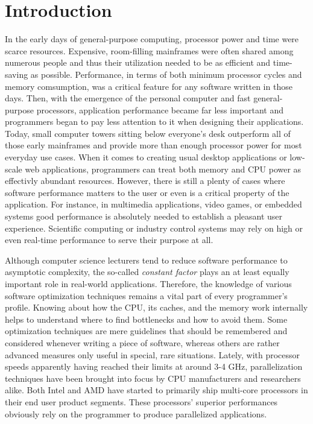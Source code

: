\section{Introduction}
In the early days of general-purpose computing, processor power and time were scarce resources. Expensive, room-filling mainframes were often shared among numerous people and thus their utilization needed to be as efficient and time-saving as possible.   Performance, in terms of both minimum processor cycles and memory comsumption, was a critical feature for any software written in those days. Then, with the emergence of the personal computer and fast general-purpose processors, application performance became far less important and programmers began to pay less attention to it when designing their applications. Today, small computer towers sitting below everyone's desk outperform all of those early mainframes and provide more than enough processor power for most everyday use cases. When it comes to creating usual desktop applications or low-scale web applications, programmers can treat both memory and CPU power as effectivly abundant resources. However, there is still a plenty of cases where software performance matters to the user or even is a critical property of the application. For instance, in multimedia applications, video games, or embedded systems good performance is absolutely needed to establish a pleasant user experience. Scientific computing or industry control systems may rely on high or even real-time performance to serve their purpose at all.

Although computer science lecturers tend to reduce software performance to asymptotic complexity, the so-called \emph{constant factor} plays an at least equally important role in real-world applications. Therefore, the knowledge of various software optimization techniques remains a vital part of every programmer's profile. Knowing about how the CPU, its caches, and the memory work internally helps to understand where to find bottlenecks and how to avoid them. Some optimization techniques are mere guidelines that should be remembered and considered whenever writing a piece of software, whereas others are rather advanced measures only useful in special, rare situations. Lately, with processor speeds apparently having reached their limits at around 3-4 GHz, parallelization techniques have been brought into focus by CPU manufacturers and researchers alike. Both Intel and AMD have started to primarily ship multi-core processors in their end user product segments. These processors' superior performances obviously rely on the programmer to produce parallelized applications. 

